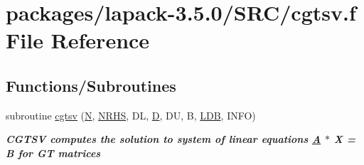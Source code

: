 \hypertarget{cgtsv_8f}{}\section{packages/lapack-\/3.5.0/\+S\+R\+C/cgtsv.f File Reference}
\label{cgtsv_8f}
\subsection*{Functions/\+Subroutines}
\begin{DoxyCompactItemize}
\item 
subroutine \hyperlink{group__complexGTsolve_ga6df7eac5a9b0c335f43c3979612f84fc}{cgtsv} (\hyperlink{polmisc_8c_a0240ac851181b84ac374872dc5434ee4}{N}, \hyperlink{example__user_8c_aa0138da002ce2a90360df2f521eb3198}{N\+R\+H\+S}, D\+L, \hyperlink{odrpack_8h_a7dae6ea403d00f3687f24a874e67d139}{D}, D\+U, B, \hyperlink{example__user_8c_a50e90a7104df172b5a89a06c47fcca04}{L\+D\+B}, I\+N\+F\+O)
\begin{DoxyCompactList}\small\item\em {\bfseries  C\+G\+T\+S\+V computes the solution to system of linear equations \hyperlink{classA}{A} $\ast$ X = B for G\+T matrices {\bfseries  }}\end{DoxyCompactList}\end{DoxyCompactItemize}
